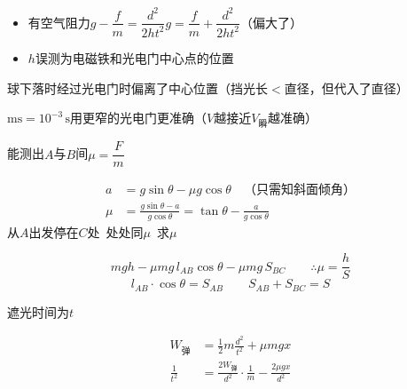 \begin{itemize}
\item 有空气阻力\quad $g-\dfrac{f}{m}=\dfrac{d^2}{2ht^2}$\quad $g=\dfrac{f}{m}+\dfrac{d^2}{2ht^2}$（偏大了）
\item $h$误测为电磁铁和光电门中心点的位置\quad {}
\end{itemize}

球下落时经过光电门时偏离了中心位置（挡光长$<$直径，但代入了直径）\quad {}

$\mathrm{ms}=10^{-3}\,\mathrm{s}$\quad 用更窄的光电门更准确（$V$越接近$V_{\text{瞬}}$越准确）


能测出$A$与$B$间$\mu=\dfrac{F}{m}$ %

\begin{align*}
a&=g\sin\theta-\mu g\cos\theta\quad\text{（只需知斜面倾角）}\\
\mu&=\frac{g\sin\theta-a}{g\cos\theta}=\tan\theta-\frac{a}{g\cos\theta}
\end{align*}
从$A$出发停在$C$处\ 处处同$\mu$\ 求$\mu$


\[mgh-\mu mg\,l_{AB}\cos\theta-\mu mg\,S_{BC}\qquad\therefore\mu=\frac{h}{S}\] %
\[l_{AB}\cdot\cos\theta=S_{AB}\qquad S_{AB}+S_{BC}=S\]

遮光时间为$t$

\begin{align*}
W_{\text{弹}}&=\frac{1}{2}m\frac{d^2}{t^2}+\mu mgx\\
\frac{1}{t^2}&=\frac{2W_{\text{弹}}}{d^2}\cdot\frac{1}{m}-\frac{2\mu gx}{d^2}
\end{align*}


